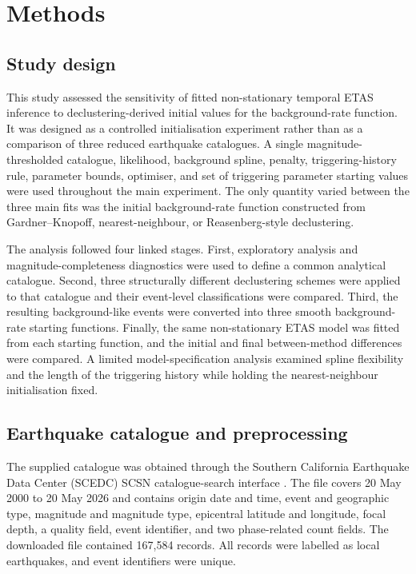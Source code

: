 
\section{Methods}
\label{sec:methods}

\subsection{Study design}
\label{sec:study_design}

This study assessed the sensitivity of fitted non-stationary temporal ETAS
inference to declustering-derived initial values for the background-rate
function. It was designed as a controlled initialisation experiment rather
than as a comparison of three reduced earthquake catalogues. A single
magnitude-thresholded catalogue, likelihood, background spline, penalty,
triggering-history rule, parameter bounds, optimiser, and set of triggering
parameter starting values were used throughout the main experiment. The only
quantity varied between the three main fits was the initial background-rate
function constructed from Gardner--Knopoff, nearest-neighbour, or
Reasenberg-style declustering.

The analysis followed four linked stages. First, exploratory analysis and
magnitude-completeness diagnostics were used to define a common analytical
catalogue. Second, three structurally different declustering schemes were
applied to that catalogue and their event-level classifications were
compared. Third, the resulting background-like events were converted into
three smooth background-rate starting functions. Finally, the same
non-stationary ETAS model was fitted from each starting function, and the
initial and final between-method differences were compared. A limited
model-specification analysis examined spline flexibility and the length of
the triggering history while holding the nearest-neighbour initialisation
fixed.

\subsection{Earthquake catalogue and preprocessing}
\label{sec:data_preprocessing}

The supplied catalogue was obtained through the Southern California
Earthquake Data Center (SCEDC) SCSN catalogue-search interface
\citep{scedc2013,scedc_catalog_search2026}. The file covers 20 May 2000 to 20
May 2026 and contains origin date and time, event and geographic type,
magnitude and magnitude type, epicentral latitude and longitude, focal depth,
a quality field, event identifier, and two phase-related count fields. The
downloaded file contained 167,584 records. All records were labelled as local
earthquakes, and event identifiers were unique.

